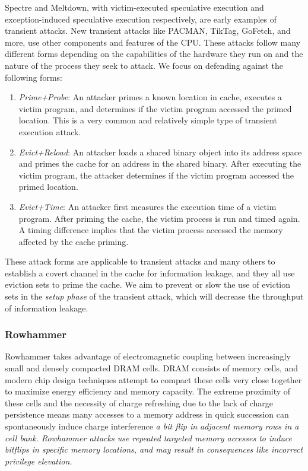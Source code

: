 \documentclass[letterpaper]{article}
\begin{document}
Spectre and Meltdown, with victim-executed speculative execution and exception-induced speculative execution respectively, 
are early examples of transient attacks.
New transient attacks like PACMAN, TikTag, GoFetch, and more, use other components and features of the CPU.
These attacks follow many different forms depending on the capabilities of the hardware they run on and the
nature of the process they seek to attack.
We focus on defending against the following forms:
\begin{enumerate}
    \item \textit{Prime+Probe}:
An attacker primes a known location in cache, executes a victim program, and determines 
if the victim program accessed the primed location. This is a very common and relatively simple
type of transient execution attack.
    \item \textit{Evict+Reload}:
An attacker loads a shared binary object into its address space and primes the cache for an address
in the shared binary.
After executing the victim program, the attacker determines if the victim program accessed the primed location.
    \item \textit{Evict+Time}:
An attacker first measures the execution time of a victim program.
After priming the cache, the victim process is run and timed again.
A timing difference implies that the victim process accessed the memory affected by the cache priming.
\end{enumerate}

These attack forms are applicable to transient attacks and many others to establish a covert channel in the cache for information leakage,
and they all use eviction sets to prime the cache.
We aim to prevent or slow the use of eviction sets in the \textit{setup phase} of the transient attack, which will decrease the throughput of information leakage.

\subsubsection{Rowhammer}

Rowhammer takes advantage of electromagnetic coupling
between increasingly small and densely compacted DRAM cells.
DRAM consists of memory cells, and modern chip design techniques attempt to compact these cells
very close together to maximize energy efficiency and memory capacity.
The extreme proximity of these cells and the necessity of charge refreshing
due to the lack of charge persistence means many accesses to a memory address
in quick succession can spontaneously induce charge interference \em a bit flip \em
in adjacent memory rows in a cell bank.
Rowhammer attacks use repeated targeted memory accesses to induce bitflips in specific memory locations,
and may result in consequences like incorrect privilege elevation.
\end{document}
